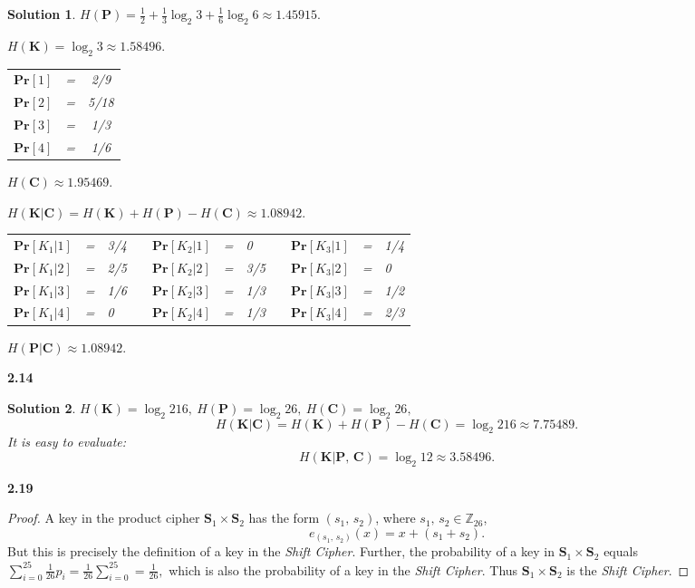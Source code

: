 \documentclass[12pt,a4paper]{article}
\newcommand{\pr}{\mathbf{Pr}}
\newcommand{\bp}{\mathbf{P}}
\newcommand{\bc}{\mathbf{C}}
\newcommand{\bk}{\mathbf{K}}
\newcommand{\bs}{\mathbf{S}}
\theoremstyle{solution}
\newtheorem*{sol}{Solution}
\begin{document}
\begin{sol}
$H(\bp)=\frac{1}{2}+\frac{1}{3} \log_2 3+\frac{1}{6} \log_2 6 \approx 1.45915.$

$H(\bk)=\log_2 3 \approx 1.58496.$\medskip

\begin{center}
\begin{tabular}{ccc}
$\pr[1]$&=&2/9\\
$\pr[2]$&=&5/18\\
$\pr[3]$&=&1/3\\
$\pr[4]$&=&1/6\\
\end{tabular}
\end{center}\medskip


$H(\bc) \approx 1.95469.$

$H(\bk|\bc)=H(\bk)+H(\bp)-H(\bc)\approx 1.08942.$

\begin{center}
\begin{tabular}{rclp{4ex}rclp{4ex}rcl}
$\pr[K_1|1]$&=&3/4 && $\pr[K_2|1]$&=&0 && $\pr[K_3|1]$&=&1/4\\
$\pr[K_1|2]$&=&2/5 && $\pr[K_2|2]$&=&3/5 && $\pr[K_3|2]$&=&0\\
$\pr[K_1|3]$&=&1/6 && $\pr[K_2|3]$&=&1/3 && $\pr[K_3|3]$&=&1/2\\
$\pr[K_1|4]$&=&0 && $\pr[K_2|4]$&=&1/3 && $\pr[K_3|4]$&=&2/3\\
\end{tabular}
\end{center}

$H(\bp|\bc)\approx 1.08942.$
\end{sol}

\textbf{2.14}

\begin{sol}
$H(\bk)=\log_2 216,\ H(\bp)=\log_2 26,\ H(\bc)=\log_2 26,$
$$H(\bk|\bc)=H(\bk)+H(\bp)-H(\bc)=\log_2 216\approx 7.75489.$$
It is easy to evaluate:
$$H(\bk|\bp,\,\bc)=\log_2 12\approx 3.58496.$$
\end{sol}

\textbf{2.19}

\begin{proof}
A key in the product cipher $\bs_1 \times \bs_2$ has the form $(s_1,\,s_2)$, where $s_1,
\,s_2 \in \mathbb{Z}_{26}$,
$$e_{(s_1,\,s_2)}(x)=x+(s_1+s_2).$$
But this is precisely the definition of a key in the {\slshape Shift Cipher}. Further, the probability of a key in $\bs_1 \times \bs_2$ equals $\sum\limits_{i=0}^{25}\frac{1}{26}p_i=\frac{1}{26}\sum\limits_{i=0}^{25}=\frac{1}{26},$
which is also the probability of a key in the {\slshape Shift Cipher}. Thus $\bs_1 \times \bs_2$ is the {\slshape Shift Cipher}.
\end{proof}
\end{document}
